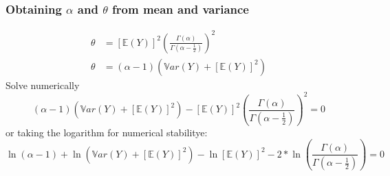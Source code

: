 \documentclass{article}
\begin{document}
\subsubsection*{Obtaining $\alpha$ and $\theta$ from mean and
  variance}
\begin{align*}
  \theta &=
  \left[\mathbb{E}(Y)\right]^2\left(\frac{\Gamma(\alpha)}{\Gamma(\alpha-\frac{1}{2})}\right)^2\\
  \theta &= (\alpha - 1)\left(\mathbb{V}ar(Y) + [\mathbb{E}(Y)]^2\right)
\end{align*}
Solve numerically
\[
(\alpha - 1)\left(\mathbb{V}ar(Y) + [\mathbb{E}(Y)]^2\right)-
\left[\mathbb{E}(Y)\right]^2\left(\frac{\Gamma(\alpha)}{\Gamma(\alpha-\frac{1}{2})}\right)^2 =0
\]
or taking the logarithm for numerical stabilitye:
\[
\ln(\alpha - 1) + \ln\left(\mathbb{V}ar(Y) + [\mathbb{E}(Y)]^2\right)-
\ln\left[\mathbb{E}(Y)\right]^2 - 2*\ln\left(\frac{\Gamma(\alpha)}{\Gamma(\alpha-\frac{1}{2})}\right) =0
\]
\end{document}
